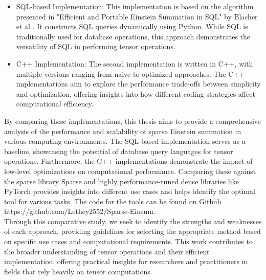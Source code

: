 \begin{itemize}
      \item SQL-based Implementation:
            This implementation is based on the algorithm presented in "Efficient and
            Portable Einstein Summation in SQL" by Blacher et al \cite{sql_einsum}.
            It constructs SQL queries dynamically using Python. While SQL is
            traditionally used for database operations, this approach demonstrates
            the versatility of SQL in performing tensor operations.
      \item C++ Implementation: The second implementation is written in C++, with multiple
            versions ranging from naive to optimized approaches. The C++ implementations
            aim to explore the performance trade-offs between simplicity and optimization,
            offering insights into how different coding strategies affect computational efficiency.
\end{itemize}
%
%
By comparing these implementations, this thesis aims to provide a comprehensive
analysis of the performance and scalability of sparse Einstein summation in various
computing environments. The SQL-based implementation serves as a baseline,
showcasing the potential of database query languages for tensor operations.
Furthermore, the C++ implementations demonstrate the impact of low-level optimizations
on computational performance. Comparing these against the sparse library Sparse and
highly performance-tuned dense libraries like PyTorch provides insights into different
use cases and helps identify the optimal tool for various tasks. The code for the tools
can be found on Github https://github.com/Lethey2552/Sparse-Einsum.
\\
Through this comparative study, we seek to identify the strengths and weaknesses
of each approach, providing guidelines for selecting the appropriate
method based on specific use cases and computational requirements. This work
contributes to the broader understanding of tensor operations and their efficient
implementation, offering practical insights for researchers and practitioners
in fields that rely heavily on tensor computations.